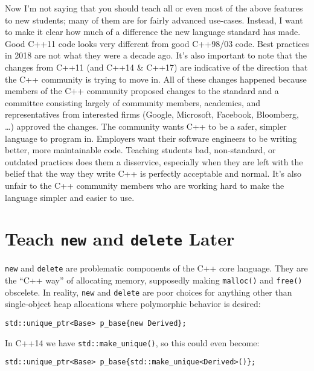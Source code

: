 \documentclass{article}
\newcommand{\CppNew}{\lstinline{new}}
\newcommand{\CppDelete}{\lstinline{delete}}
\begin{document}
Now I'm not saying that you should teach all or even most of the above features to new students; many of them are for fairly advanced use-cases.  Instead, I want to make it clear how much of a difference the new language standard has made.  Good C++11 code looks very different from good C++98/03 code.  Best practices in 2018 are not what they were a decade ago.  It's also important to note that the changes from C++11 (and C++14 \& C++17) are indicative of the direction that the C++ community is trying to move in.  All of these changes happened because members of the C++ community proposed changes to the standard and a committee consisting largely of community members, academics, and representatives from interested firms (Google, Microsoft, Facebook, Bloomberg, \ldots) approved the changes.  The community wants C++ to be a safer, simpler language to program in.  Employers want their software engineers to be writing better, more maintainable code.  Teaching students bad, non-standard, or outdated practices does them a disservice, especially when they are left with the belief that the way they write C++ is perfectly acceptable and normal.  It's also unfair to the C++ community members who are working hard to make the language simpler and easier to use.

\section*{Teach \CppNew{} and \CppDelete{} Later}
\CppNew{} and \CppDelete{} are problematic components of the C++ core language.  They are the ``C++ way'' of allocating memory, supposedly making \lstinline{malloc()} and \lstinline{free()} obscelete.  In reality, \CppNew{} and \CppDelete{} are poor choices for anything other than single-object heap allocations where polymorphic behavior is desired:
\begin{lstlisting}
std::unique_ptr<Base> p_base{new Derived};
\end{lstlisting}
In C++14 we have \lstinline{std::make_unique()}, so this could even become:
\begin{lstlisting}
std::unique_ptr<Base> p_base{std::make_unique<Derived>()};
\end{lstlisting}
\end{document}
